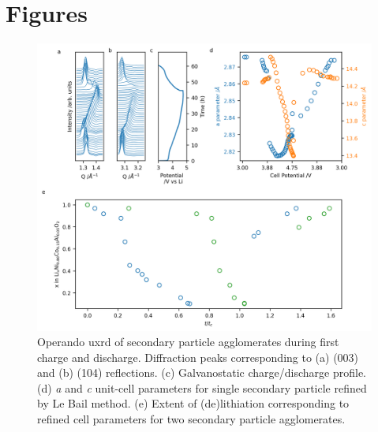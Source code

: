 \documentclass{article}
\begin{document}

\section*{Figures}

\begin{figure}
  \includegraphics{figures/NCA_xrd.png}
  \caption{Operando \gls{uxrd} of \nca{} secondary particle
    agglomerates during first charge and discharge. Diffraction peaks
    corresponding to (a) (003) and (b) (104) reflections. (c)
    Galvanostatic charge/discharge profile. (d) \textit{a} and
    \textit{c} unit-cell parameters for single secondary particle
    refined by Le Bail method. (e) Extent of (de)lithiation
    corresponding to refined cell parameters\cite{robert2015} for two
    secondary particle agglomerates.}
  \label{fig:uxrd}
\end{figure}
\end{document}
